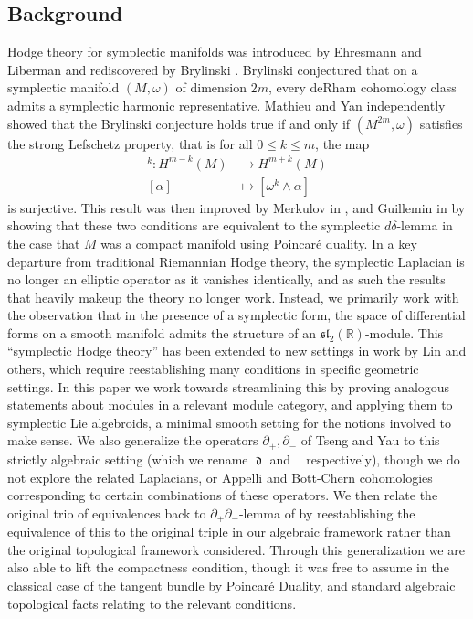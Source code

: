 \documentclass{amsart}
\newcommand{\p}{\partial}
\newcommand{\R}{\mathbb{R}}
\newcommand{\ra}{\rightarrow}
\DeclareMathOperator{\dee}{\mathfrak{d}}
\DeclareMathOperator{\deebar}{\overline{\mathfrak{d}}}
\theoremstyle{definition}
\begin{document}
\subsection{Background}
Hodge theory for symplectic manifolds was introduced by Ehresmann and Liberman and rediscovered by Brylinski \cite{BrylinskiPoisson}. Brylinski conjectured that on a symplectic manifold $(M,\omega)$ of dimension $2m$, every deRham cohomology class admits a symplectic harmonic representative. Mathieu \cite{Mathieu} and Yan \cite{YAN1996143} independently showed that the Brylinski conjecture holds true if and only if $(M^{2m},\omega)$ satisfies the strong Lefschetz property, that is for all $0 \leq k \leq m$, the map 
\begin{align*}
    [L]^k:H^{m-k}(M) &\ra H^{m+k}(M) \\
    [\alpha] &\mapsto [\omega^k \wedge \alpha]
\end{align*}
is surjective. This result was then improved by Merkulov in \cite{merkulov1998formality}, and Guillemin in \cite{Guilleminddlemma} by showing that these two conditions are equivalent to the symplectic $d \delta$-lemma in the case that $M$ was a compact manifold using Poincar\'e duality. In a key departure from traditional Riemannian Hodge theory, the symplectic Laplacian is no longer an elliptic operator as it vanishes identically, and as such the results that heavily makeup the theory no longer work. Instead, we primarily work with the observation that in the presence of a symplectic form, the space of differential forms on a smooth manifold admits the structure of an $\mathfrak{sl}_2(\R)$-module. This ``symplectic Hodge theory'' has been extended to new settings in work by Lin \cite{equivariantddlemma} and others, which require reestablishing many conditions in specific geometric settings. In this paper we work towards streamlining this by proving analogous statements about modules in a relevant module category, and applying them to symplectic Lie algebroids, a minimal smooth setting for the notions involved to make sense. We also generalize the operators $\p_+,\p_-$ of Tseng and Yau \cite{tseng2012cohomologyhodgetheorysymplectic} to this strictly algebraic setting (which we rename $\dee$ and $\deebar$ respectively), though we do not explore the related Laplacians, or Appelli and Bott-Chern cohomologies corresponding to certain combinations of these operators. We then relate the original trio of equivalences back to $\p_+\p_-$-lemma of \cite{HoSym} by reestablishing the equivalence of this to the original triple in our algebraic framework rather than the original topological framework considered. Through this generalization we are also able to lift the compactness condition, though it was free to assume in the classical case of the tangent bundle by Poincar\'e Duality, and standard algebraic topological facts relating to the relevant conditions.
\end{document}
